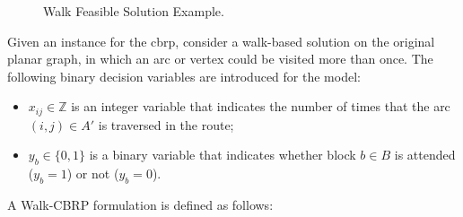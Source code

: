 \begin{figure}[h!]
\begin{minipage}[c]{.4\textwidth}
	\end{minipage}
	\caption{\label{fig:walk-feasible-solution-example} Walk Feasible Solution Example.}
\end{figure}


Given an instance for the \gls{cbrp}, consider a walk-based solution on the
original planar graph, in which an arc or vertex could be visited more than
once. The following binary decision variables are introduced for the model:

\begin{itemize}
	\item $x_{ij} \in \mathbb{Z}$ is an integer variable that indicates the number of times that the arc $(i, j) \in A'$ is traversed in the route;
	\item $y_{b} \in \{0, 1\}$ is a binary variable that indicates whether block $b \in B$ is attended ($y_{b} = 1$) or not ($y_{b} = 0$).
\end{itemize}

A Walk-CBRP formulation is defined as follows:


